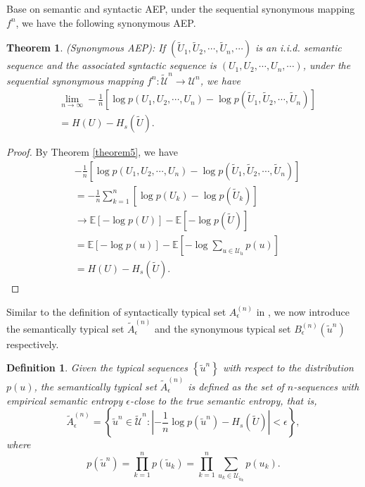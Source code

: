 \documentclass[12pt, draftclsnofoot,onecolumn]{IEEEtran}
\newtheorem{theorem}{\bf{Theorem}}
\newtheorem{definition}{\bf{Definition}}
\begin{document}
Base on semantic and syntactic AEP, under the sequential synonymous mapping $f^n$, we have the following synonymous AEP.
\begin{theorem}
(Synonymous AEP):
If $(\tilde {U}_1,\tilde {U}_2,\cdots,\tilde {U}_n,\cdots)$ is an i.i.d. semantic sequence and the associated syntactic sequence is $\left(U_1,U_2,\cdots,U_n,\cdots\right)$, under the sequential synonymous mapping $f^n: \tilde{\mathcal{U}}^n\to\mathcal{U}^n$, we have
\begin{equation}
\begin{aligned}
&\lim_{n\to\infty}-\frac{1}{n}\left[\log p\left(U_1,U_2,\cdots,U_n\right)-\log p(\tilde {U}_1,\tilde {U}_2,\cdots,\tilde {U}_n)\right]\\
&=H\left(U\right)-H_s(\tilde {U}).
\end{aligned}
\end{equation}
\end{theorem}
\begin{proof}
By Theorem \ref{theorem5}, we have
\begin{equation}
\begin{aligned}
&-\frac{1}{n}\left[\log p\left(U_1,U_2,\cdots,U_n\right)-\log p(\tilde {U}_1,\tilde {U}_2,\cdots,\tilde {U}_n)\right]\\
&=-\frac{1}{n}\sum_{k=1}^{n}\left[\log p(U_{k})-\log p(\tilde{U}_{k})\right]\\
&\to \mathbb{E} \left[-\log p(U)\right]-\mathbb{E} \left[-\log p(\tilde{U})\right]\\
&=\mathbb{E}\left[-\log p(u)\right]-\mathbb{E} \left[-\log \sum_{u\in \mathcal{U}_{\tilde{u}}}p(u)\right]\\
&=H(U)-H_s(\tilde{U}).
\end{aligned}
\end{equation}
\end{proof}

Similar to the definition of syntactically typical set $A_{\epsilon}^{(n)}$ in \cite{Book_Cover}, we now introduce the semantically typical set $\tilde{A}_{\epsilon}^{(n)}$ and the synonymous typical set $B_{\epsilon}^{(n)}\left(\tilde{u}^n\right)$ respectively.
\begin{definition}\label{definition12}
Given the typical sequences $\left\{\tilde{u}^n\right\}$ with respect to the distribution $p(u)$, the semantically typical set ${\tilde{A}}_{\epsilon}^{(n)}$ is defined as the set of $n$-sequences with empirical semantic entropy $\epsilon$-close to the true semantic entropy, that is,
\begin{equation}
{\tilde{A}}_{\epsilon}^{(n)}=\left\{\tilde{u}^n\in \tilde{\mathcal{U}}^n: \left|-\frac{1}{n}\log p\left(\tilde{u}^n\right)-H_s(\tilde{U})\right|<\epsilon\right\},
\end{equation}
where
\begin{equation}
p\left(\tilde{u}^n\right)=\prod_{k=1}^{n} p(\tilde{u}_k)=\prod_{k=1}^{n} \sum_{u_k\in \mathcal{U}_{\tilde{u}_k}}p(u_k).
\end{equation}
\end{definition}
\end{document}
